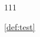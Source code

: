 \documentclass[./test]{subfiles}
\begin{document}
\begin{definition}\label{def:test}
  111
\end{definition}
\ref{def:test}
\end{document}
